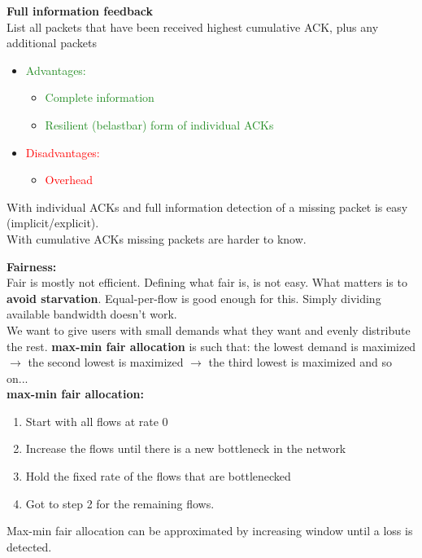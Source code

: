 \documentclass[a4paper, fontsize=8pt, landscape, DIV=1]{scrartcl}
\begin{document}
\begin{multicols*}{4}
		\textbf{Full information feedback}\\
		List all packets that have been received highest cumulative ACK, plus any
		additional packets
		\vspace{-0.2cm}
		\begin{itemize}[noitemsep]
			\item \textcolor{ForestGreen}{Advantages:}
			\begin{itemize}
				\item \textcolor{ForestGreen}{Complete information}
				\item \textcolor{ForestGreen}{Resilient (belastbar) form of individual
					ACKs}
			\end{itemize}
			\item \textcolor{red}{Disadvantages:}
			\begin{itemize}
				\item \textcolor{red}{Overhead}
			\end{itemize} 
		\end{itemize}
		
		With individual ACKs and full information detection of a missing packet is
		easy (implicit/explicit). \\
		With cumulative ACKs missing packets are harder to know. \par
		
		\textbf{Fairness:}\\
		Fair is mostly not efficient. Defining what fair is, is not easy. What
		matters is to \textbf{avoid starvation}. Equal-per-flow is good enough for this.
		Simply dividing available bandwidth doesn't work.\\
		We want to give users with small demands what they want and evenly
		distribute the rest. \textbf{max-min fair allocation} is such that: the lowest
		demand is maximized $\rightarrow$ the second lowest is maximized $\rightarrow$
		the third lowest is maximized and so on...\\
		\textbf{max-min fair allocation:}
		\begin{enumerate}[noitemsep]
			\item Start with all flows at rate 0
			\item Increase the flows until there is a new bottleneck in the network
			\item Hold the fixed rate of the flows that are bottlenecked
			\item Got to step 2 for the remaining flows. 	 
		\end{enumerate}  
		Max-min fair allocation can be approximated by increasing window until a
		loss is detected. \par
		

\end{multicols*}
\end{document}
